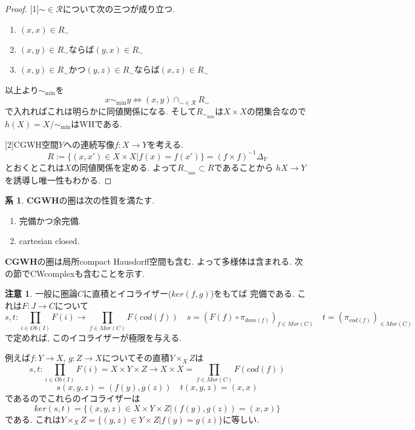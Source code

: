 \documentclass[dvipdfmx,a4paper,11pt]{article}
\theoremstyle{definition}
\newtheorem{cor}[thm]{系}
\newtheorem{rem}[thm]{注意}
\begin{document}
\begin{proof}

[1]$\sim \in \mathcal{R}$について次の三つが成り立つ.
\begin{enumerate}
\item $(x,x) \in R_{\sim}$
\item $(x,y)\in R_{\sim}$ならば$(y,x) \in R_{\sim}$
\item $(x,y) \in R_{\sim}$かつ$(y,z) \in R_{\sim}$ならば$(x,z) \in R_{\sim}$
\end{enumerate}
以上より$\sim_{\min}$を
$$
x \sim_{\min} y
\Leftrightarrow
(x,y) \cap_{\sim \in \mathcal{R}} R_{\sim}
$$
で入れればこれは明らかに同値関係になる.
そして$R_{\sim_{\min}}$は$X \times X$の閉集合なので$h(X)=X/\sim_{\min}$はWHである.

[2]CGWH空間$Y$への連続写像$f : X \to Y$を考える.
$$
R:= \{ (x, x') \in X \times X | f(x) = f(x')\}=(f \times f)^{-1}\Delta_{Y}
$$
とおくとこれは$X$の同値関係を定める.
よって$R_{\sim_{\min}} \subset R$であることから
$hX \to Y$を誘導し唯一性もわかる.  
\end{proof}

 \begin{tcolorbox}
 [colback = white, colframe = green!35!black, fonttitle = \bfseries,breakable = true]
\begin{cor}\cite[Cor2.23, Prop2.24]{Str}
{\bf CGWH}の圏は次の性質を満たす.
\begin{enumerate}
\item 完備かつ余完備.
\item cartesian closed.
\end{enumerate}
\end{cor}
\end{tcolorbox}

{\bf CGWH}の圏は局所compact Hausdorff空間も含む. よって多様体は含まれる.  
次の節でCWcomplexも含むことを示す. 


\begin{rem}
一般に圏論$C$に直積とイコライザー($ker(f,g)$)をもてば
完備である.
これは$F : J \to C$について
$$
s, t : \prod_{i  \in Ob(I)}F(i) \to\prod_{f \in Mor(C)} F(cod(f))
\quad s=(F(f) \circ \pi_{dom(f)}) _{f \in Mor(C)}
\quad t=(\pi_{cod(f)})_{ \in Mor(C)}
$$
で定めれば, このイコライザーが極限を与える.

例えば$f : Y\to X$, $g : Z\to X$についてその直積$Y\times_{X}Z$は
$$
s, t :\prod_{i  \in Ob(I)}F(i)=X \times Y \times Z \to X \times X =\prod_{f \in Mor(C)} F(cod(f))
$$
$$
 s(x,y,z) =  (f(y), g(z))
\quad t(x,y,z)=(x,x)
$$
であるのでこれらのイコライザーは
$$
ker(s,t)=\{(x,y,z)\in X \times Y \times Z | (f(y), g(z))=(x,x) \}
$$
である. これは$Y \times_{X}Z=\{(y,z)\in Y \times Z |f(y)=g(z)\}$に等しい. 
\end{rem}
\end{document}
